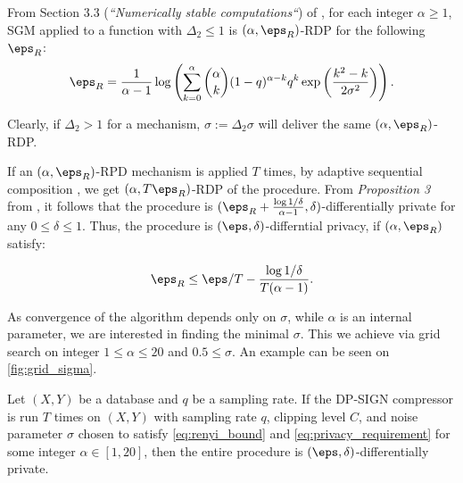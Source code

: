 From Section 3.3 (\textit{``Numerically stable computations``}) of \cite{mironov2019SGM}, for each integer $\alpha \geq 1$, SGM applied to a function with $\Delta_2\leq1$ is $(\alpha, \eps_R)$-RDP for the following $\eps_R$:
\begin{equation}\label{eq:renyi_bound}
\eps_R = \frac{1}{\alpha - 1} \log\left(\sum_{k=0}^{\alpha} {\alpha \choose k}  (1-q)^{\alpha-k}q^{k} \exp\left(\frac{k^2 - k}{2\sigma^2}\right)\right).
\end{equation}

Clearly, if $\Delta_2 > 1$ for a mechanism, $\sigma := \Delta_2 \sigma$ will deliver the same $(\alpha, \eps_R)$-RDP.

If an $(\alpha, \eps_R)$-RPD mechanism is applied $T$ times, by adaptive sequential composition \cite{Mironov2017}, we get $(\alpha, T\eps_R)$-RDP of the procedure. From \textit{Proposition 3} from \cite{Mironov2017}, it follows that the procedure is $(\eps_R + \frac{\log1/\delta}{\alpha - 1}, \delta)$-differentially private for any $0 \leq \delta \leq 1$. Thus, the procedure is $(\eps, \delta)$-differntial privacy, if $(\alpha, \eps_R)$ satisfy:

\begin{equation}\label{eq:privacy_requirement}
\eps_R \leq \eps/T - \frac{\log 1/\delta}{T(\alpha - 1)}.
\end{equation}

As convergence of the algorithm depends only on $\sigma$, while $\alpha$ is an internal parameter, we are interested in finding the minimal $\sigma$. This we achieve via grid search on integer $1\leq \alpha \leq 20$ and $0.5 \leq \sigma$. An example can be seen on \ref{fig:grid_sigma}.

\begin{proposition}\label{prop:dp_guarantee}
Let $(X, Y)$ be a database and $q$ be a sampling rate. If the DP-SIGN compressor is run $T$ times on $(X, Y)$ with sampling rate $q$, clipping level $C$, and noise parameter $\sigma$ chosen to satisfy \eqref{eq:renyi_bound} and \eqref{eq:privacy_requirement} for some integer $\alpha \in [1,20]$, then the entire procedure is $(\eps, \delta)$-differentially private.
\end{proposition}

